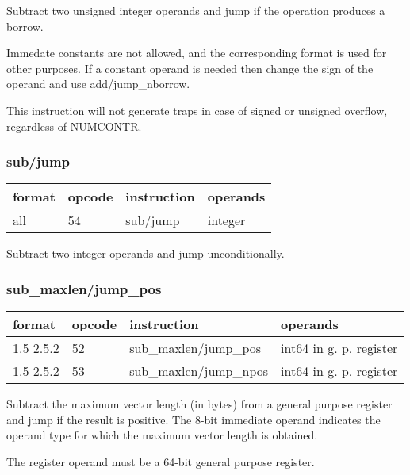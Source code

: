 \documentclass[forwardcom.tex]{subfiles}
\begin{document}
Subtract two unsigned integer operands and jump if the operation produces a borrow.
\vspace{2mm}

Immedate constants are not allowed, and the corresponding format is used for other purposes.
If a constant operand is needed then change the sign of the operand and use add/jump\_nborrow. 
\vspace{2mm}

This instruction will not generate traps in case of signed or unsigned overflow, regardless of  NUMCONTR.
\vspace{2mm}

\subsubsection{sub/jump}
\label{table:subJumpInstruction}
\begin{tabular}{|p{16mm}|p{12mm}|p{60mm}|p{50mm}|}
\hline
\bfseries format & \bfseries opcode & \bfseries instruction & \bfseries operands \\ \hline
all & 54 & sub/jump & integer \\ \hline
\end{tabular}
\vspace{2mm}

Subtract two integer operands and jump unconditionally.


\subsubsection{sub\_maxlen/jump\_pos}
\label{table:subMaxlenJumpPosInstruction}
\begin{tabular}{|p{16mm}|p{12mm}|p{60mm}|p{50mm}|}
\hline
\bfseries format & \bfseries opcode & \bfseries instruction & \bfseries operands \\ \hline
1.5 2.5.2 & 52 & sub\_maxlen/jump\_pos & int64 in g. p. register \\ \hline
1.5 2.5.2 & 53 & sub\_maxlen/jump\_npos & int64 in g. p. register \\ \hline
\end{tabular}
\vspace{2mm}

Subtract the maximum vector length (in bytes) from a general purpose register and jump if the result is positive.
The 8-bit immediate operand indicates the operand type for which the maximum vector length is obtained.
\vspace{2mm}

The register operand must be a 64-bit general purpose register.
\vspace{2mm}
\end{document}
